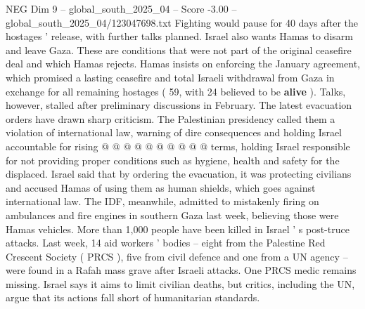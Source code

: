 \begin{textsample}{NEG Dim 9 – global\_south\_2025\_04 – Score -3.00 – global\_south\_2025\_04/123047698.txt}
Fighting would pause for 40 days after the hostages ' release, with further talks planned.
Israel also wants Hamas to disarm and leave Gaza.
These are conditions that were not part of the original ceasefire deal and which Hamas rejects.
Hamas insists on enforcing the January agreement, which promised a lasting ceasefire and total Israeli withdrawal from Gaza in exchange for all remaining hostages ( 59, with 24 believed to be \textbf{alive} ).
Talks, however, stalled after preliminary discussions in February.
The latest evacuation orders have drawn sharp criticism.
The Palestinian presidency called them a violation of international law, warning of dire consequences and holding Israel accountable for rising @ @ @ @ @ @ @ @ @ @ terms, holding Israel responsible for not providing proper conditions such as hygiene, health and safety for the displaced.
Israel said that by ordering the evacuation, it was protecting civilians and accused Hamas of using them as human shields, which goes against international law.
The IDF, meanwhile, admitted to mistakenly firing on ambulances and fire engines in southern Gaza last week, believing those were Hamas vehicles.
More than 1,000 people have been killed in Israel ' s post-truce attacks.
Last week, 14 aid workers ' bodies -- eight from the Palestine Red Crescent Society ( PRCS ), five from civil defence and one from a UN agency -- were found in a Rafah mass grave after Israeli attacks.
One PRCS medic remains missing.
Israel says it aims to limit civilian deaths, but critics, including the UN, argue that its actions fall short of humanitarian standards.

\end{textsample}
